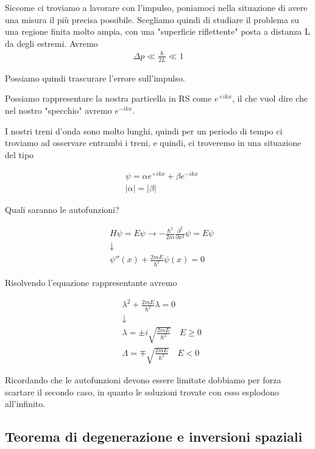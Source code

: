 Siccome ci troviamo a lavorare con l'impulso, poniamoci nella situazione di avere una misura il più precisa possibile. Scegliamo quindi di studiare il problema su una regione finita molto ampia, con una "superficie riflettente" posta a distanza L da degli estremi.
Avremo
\begin{align}
\Delta p \ll \frac{\hbar}{2 L } \ll 1
\end{align}

Possiamo quindi trascurare l'errore sull'impulso. 

Possiamo rappresentare la nostra particella in RS come 
$e^{+ikx}$, il che vuol dire che nel nostro "specchio" avremo $e^{-ikx}$.

I nostri treni d'onda sono molto lunghi, quindi per un periodo di tempo ci troviamo ad osservare entrambi i treni, e quindi, ci troveremo in una situazione del tipo

\begin{align}
{}&\psi= \alpha e^{+ikx} + \beta e^{-ikx} \\
&|\alpha|=|\beta|  
\end{align}

Quali saranno le autofunzioni?

\begin{align}
{}&H\psi= E\psi \rightarrow -\frac{\hbar^2}{2m} \frac{\partial^2}{\partial x^2}\psi = E\psi \\
&\downarrow \nonumber \\
&\psi''(x) + \frac{2mE}{\hbar^2}\psi(x)=0
\end{align}

Risolvendo l'equazione rappresentante avremo

\begin{align}
&\lambda^2 + \frac{2mE}{\hbar^2}\lambda=0 \nonumber \\
&\downarrow \nonumber \\
&\lambda = \pm i \sqrt{\frac{2mE}{\hbar^2}} \quad E \geq 0 \\
&\Lambda = \mp \sqrt{\frac{2mE}{\hbar^2}} \quad E < 0
\end{align}

Ricordando che le autofunzioni devono essere limitate dobbiamo per forza scartare il secondo caso, in quanto le soluzioni trovate con esso esplodono all'infinito.
\newpage

\subsection{Teorema di degenerazione e inversioni spaziali}

